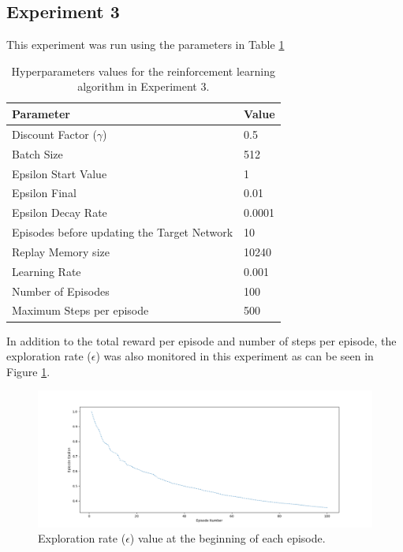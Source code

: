 \documentclass[12pt,oneside]{article}
\begin{document}
\subsection{Experiment 3}
This experiment was run using the parameters in Table \ref{tab:hyperparams-exp-3}
\begin{table}[H]
\centering
\begin{tabular}{l l}
\hline
Parameter & Value \\
\hline
Discount Factor ($\gamma$) & 0.5 \\
Batch Size & 512 \\
Epsilon Start Value & 1 \\
Epsilon Final & 0.01 \\
Epsilon Decay Rate & 0.0001 \\
Episodes before updating the Target Network & 10 \\
Replay Memory size & 10240 \\
Learning Rate & 0.001 \\
Number of Episodes & 100 \\
Maximum Steps per episode & 500 \\
\hline
\end{tabular}
\caption{Hyperparameters values for the reinforcement learning algorithm in Experiment 3.}
\label{tab:hyperparams-exp-3}
\end{table}
In addition to the total reward per episode and number of steps per episode, the exploration rate ($\epsilon$) was also monitored in this experiment as can be seen in Figure \ref{fig:epsilon_episodes_100_gamma_05}.
\begin{figure}[H]
\centering
\includegraphics[width=0.9\linewidth]{epsilon_episodes_100_gamma_05.png}
\caption{Exploration rate ($\epsilon$) value at the beginning of each episode. }
\label{fig:epsilon_episodes_100_gamma_05}
\end{figure}
\end{document}
